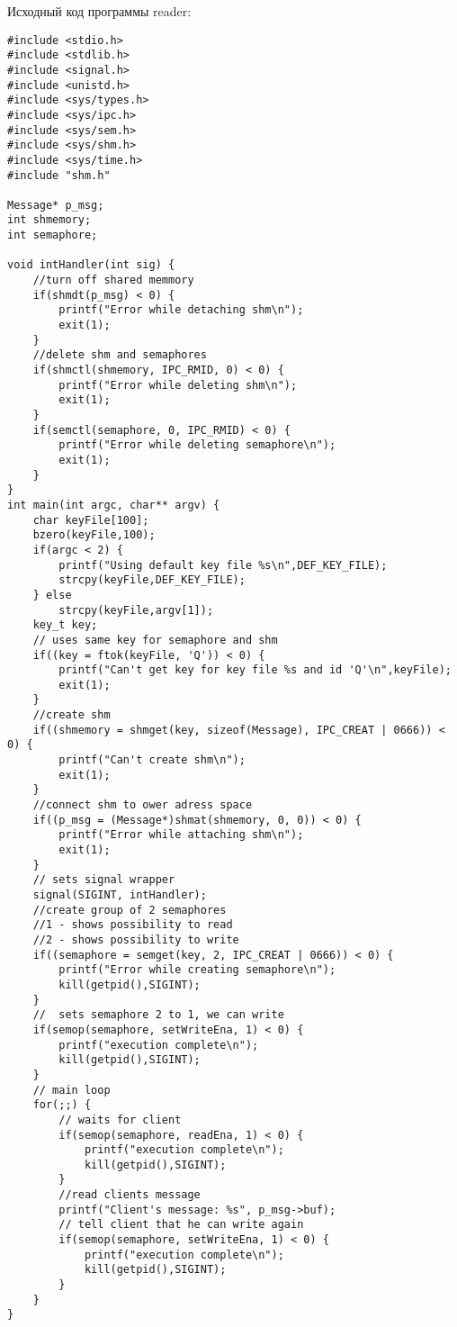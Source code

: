 \documentclass[a4paper]{article}
\begin{document}
	Исходный код программы reader:
	\begin{lstlisting}[style=crs_cpp]
#include <stdio.h>
#include <stdlib.h>
#include <signal.h>
#include <unistd.h>
#include <sys/types.h>
#include <sys/ipc.h>
#include <sys/sem.h>
#include <sys/shm.h>
#include <sys/time.h>
#include "shm.h"

Message* p_msg;
int shmemory;
int semaphore;

void intHandler(int sig) {
	//turn off shared memmory
	if(shmdt(p_msg) < 0) {
		printf("Error while detaching shm\n");
		exit(1);
	}
	//delete shm and semaphores
	if(shmctl(shmemory, IPC_RMID, 0) < 0) {
		printf("Error while deleting shm\n");
		exit(1);
	}
	if(semctl(semaphore, 0, IPC_RMID) < 0) {
		printf("Error while deleting semaphore\n");
		exit(1);
	}
}
int main(int argc, char** argv) {
	char keyFile[100];
	bzero(keyFile,100);
	if(argc < 2) {
		printf("Using default key file %s\n",DEF_KEY_FILE);
		strcpy(keyFile,DEF_KEY_FILE);
	} else
		strcpy(keyFile,argv[1]);
	key_t key;
	// uses same key for semaphore and shm
	if((key = ftok(keyFile, 'Q')) < 0) {
		printf("Can't get key for key file %s and id 'Q'\n",keyFile);
		exit(1);
	}
	//create shm
	if((shmemory = shmget(key, sizeof(Message), IPC_CREAT | 0666)) < 0) {
		printf("Can't create shm\n");
		exit(1);
	}
	//connect shm to ower adress space
	if((p_msg = (Message*)shmat(shmemory, 0, 0)) < 0) {
		printf("Error while attaching shm\n");
		exit(1);
	}
	// sets signal wrapper
	signal(SIGINT, intHandler);
	//create group of 2 semaphores
	//1 - shows possibility to read
	//2 - shows possibility to write
	if((semaphore = semget(key, 2, IPC_CREAT | 0666)) < 0) {
		printf("Error while creating semaphore\n");
		kill(getpid(),SIGINT);
	}
	//  sets semaphore 2 to 1, we can write
	if(semop(semaphore, setWriteEna, 1) < 0) {
		printf("execution complete\n");
		kill(getpid(),SIGINT);
	}
	// main loop
	for(;;) {
		// waits for client
		if(semop(semaphore, readEna, 1) < 0) {
			printf("execution complete\n");
			kill(getpid(),SIGINT);
		}
		//read clients message
		printf("Client's message: %s", p_msg->buf);
		// tell client that he can write again
		if(semop(semaphore, setWriteEna, 1) < 0) {
			printf("execution complete\n");
			kill(getpid(),SIGINT);
		}
	}
}
	\end{lstlisting}
		
\end{document}
